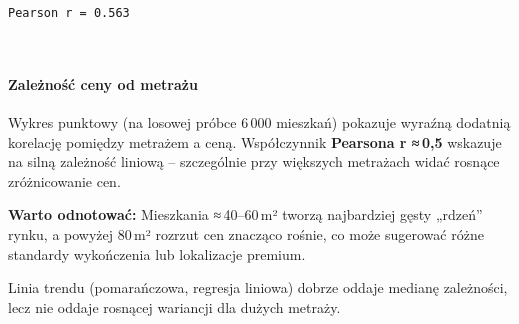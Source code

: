 \documentclass[11pt]{article}
\begin{document}
    \begin{Verbatim}[commandchars=\\\{\}]
Pearson r = 0.563
    \end{Verbatim}

    \begin{center}
    \end{center}
    { \hspace*{\fill} \\}
    
    \paragraph{Zależność ceny od
metrażu}\label{zaleux17cnoux15bux107-ceny-od-metraux17cu}

Wykres punktowy (na losowej próbce 6\,000 mieszkań) pokazuje wyraźną
dodatnią korelację pomiędzy metrażem a ceną. Współczynnik
\textbf{Pearsona r ≈\,0,5} wskazuje na silną zależność liniową --
szczególnie przy większych metrażach widać rosnące zróżnicowanie cen.

\textbf{Warto odnotować:} Mieszkania ≈\,40--60\,m² tworzą najbardziej
gęsty „rdzeń'' rynku, a powyżej 80\,m² rozrzut cen znacząco rośnie, co
może sugerować różne standardy wykończenia lub lokalizacje premium.

Linia trendu (pomarańczowa, regresja liniowa) dobrze oddaje medianę
zależności, lecz nie oddaje rosnącej wariancji dla dużych metraży.
\end{document}
